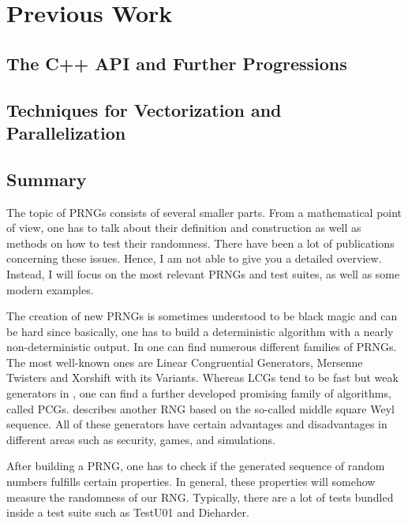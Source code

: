 \documentclass{stdlocal}
\begin{document}
\section{Previous Work} %
\label{sec:previous_work}
  \subsection{The C++ API and Further Progressions} %
  \label{sub:the_c_api_and_further_progressions}


  \subsection{Techniques for Vectorization and Parallelization} %
  \label{sub:techniques_for_vectorization_and_parallelization}


  \subsection{Summary} %
  \label{sub:summary}


  The topic of PRNGs consists of several smaller parts.
  From a mathematical point of view, one has to talk about their definition and construction as well as methods on how to test their randomness.
  There have been a lot of publications concerning these issues.
  Hence, I am not able to give you a detailed overview.
  Instead, I will focus on the most relevant PRNGs and test suites, as well as some modern examples.

  The creation of new PRNGs is sometimes understood to be black magic and can be hard since basically, one has to build a deterministic algorithm with a nearly non-deterministic output.
  In \cite{kneusel2018} one can find numerous different families of PRNGs.
  The most well-known ones are Linear Congruential Generators, Mersenne Twisters and Xorshift with its Variants.
  Whereas LCGs tend to be fast but weak generators in \cite{oneill2014}, one can find a further developed promising family of algorithms, called PCGs.
  \cite{widynski2019} describes another RNG based on the so-called middle square Weyl sequence.
  All of these generators have certain advantages and disadvantages in different areas such as security, games, and simulations.

  After building a PRNG, one has to check if the generated sequence of random numbers fulfills certain properties.
  In general, these properties will somehow measure the randomness of our RNG.
  Typically, there are a lot of tests bundled inside a test suite such as TestU01 and Dieharder.
\end{document}
